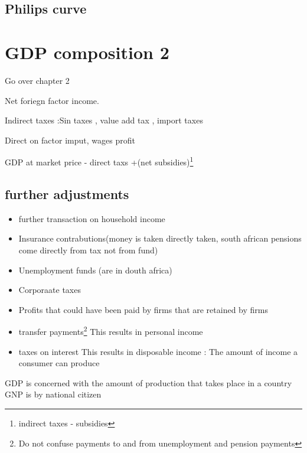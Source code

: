 \documentclass[twocolumn]{article}
\providecommand{\tightlist}{%
  \setlength{\itemsep}{0pt}\setlength{\parskip}{0pt}}
\begin{document}
\hypertarget{philips-curve}{%
\subsection{Philips curve}\label{philips-curve}}

\hypertarget{gdp-composition-2}{%
\section{GDP composition 2}\label{gdp-composition-2}}

Go over chapter 2

Net foriegn factor income.

Indirect taxes :Sin taxes , value add tax , import taxes

\begin{description}
\tightlist
\item[Directs taxes]
Direct on factor imput, wages profit
\end{description}

GDP at market price - direct taxs +(net subsidies)\footnote{indirect
  taxes - subsidies}

\hypertarget{further-adjustments}{%
\subsection{further adjustments}\label{further-adjustments}}

\begin{itemize}
\tightlist
\item
  further transaction on household income
\item
  Insurance contrabutions(money is taken directly taken, south african
  pensions come directly from tax not from fund)
\item
  Unemployment funds (are in douth africa)
\item
  Corporaate taxes
\item
  Profits that could have been paid by firms that are retained by firms
\item
  transfer payments\footnote{Do not confuse payments to and from
    unemployment and pension payments} This results in personal income
\item
  taxes on interest This results in disposable income : The amount of
  income a consumer can produce
\end{itemize}

GDP is concerned with the amount of production that takes place in a
country GNP is by national citizen
\end{document}
